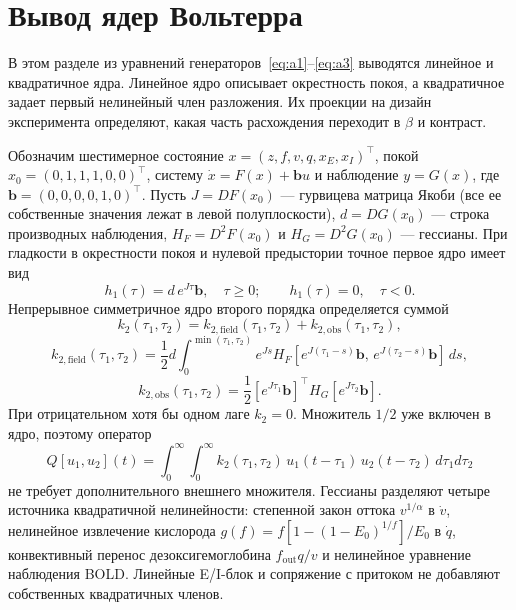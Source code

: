 
\section{Вывод ядер Вольтерра}
\label{sec:mathspec}

В этом разделе из уравнений генераторов~\eqref{eq:a1}--\eqref{eq:a3} выводятся линейное и квадратичное ядра. Линейное ядро описывает окрестность покоя, а квадратичное задает первый нелинейный член разложения. Их проекции на дизайн эксперимента определяют, какая часть расхождения переходит в $\beta$ и контраст.

Обозначим шестимерное состояние $x=(z,f,v,q,x_E,x_I)^\top$, покой $x_0=(0,1,1,1,0,0)^\top$, систему $\dot x=F(x)+\mathbf b u$ и наблюдение $y=G(x)$, где $\mathbf b=(0,0,0,0,1,0)^\top$. Пусть $J=DF(x_0)$ --- гурвицева матрица Якоби (все ее собственные значения лежат в левой полуплоскости), $d=DG(x_0)$ --- строка производных наблюдения, $H_F=D^2F(x_0)$ и $H_G=D^2G(x_0)$ --- гессианы. При гладкости в окрестности покоя и нулевой предыстории точное первое ядро имеет вид
\begin{equation}\label{eq:h1}
h_1(\tau)=d\,e^{J\tau}\mathbf b,\quad \tau\ge0;\qquad h_1(\tau)=0,\quad\tau<0.
\end{equation}
Непрерывное симметричное ядро второго порядка определяется суммой
\begin{equation}\label{eq:k2}
k_2(\tau_1,\tau_2)=k_{2,\mathrm{field}}(\tau_1,\tau_2)+k_{2,\mathrm{obs}}(\tau_1,\tau_2),
\end{equation}
\begin{equation}\label{eq:k2field}
k_{2,\mathrm{field}}(\tau_1,\tau_2)=\frac12 d\int_0^{\min(\tau_1,\tau_2)}e^{Js}H_F[e^{J(\tau_1-s)}\mathbf b,\,e^{J(\tau_2-s)}\mathbf b]\,ds,
\end{equation}
\begin{equation}\label{eq:k2obs}
k_{2,\mathrm{obs}}(\tau_1,\tau_2)=\frac12[e^{J\tau_1}\mathbf b]^\top H_G[e^{J\tau_2}\mathbf b].
\end{equation}
При отрицательном хотя бы одном лаге $k_2=0$. Множитель $1/2$ уже включен в ядро, поэтому оператор
\begin{equation}\label{eq:Q}
Q[u_1,u_2](t)=\int_0^\infty\int_0^\infty k_2(\tau_1,\tau_2)\,u_1(t-\tau_1)\,u_2(t-\tau_2)\,d\tau_1d\tau_2
\end{equation}
не требует дополнительного внешнего множителя. Гессианы разделяют четыре источника квадратичной нелинейности: степенной закон оттока $v^{1/\alpha}$ в $\dot v$, нелинейное извлечение кислорода $g(f)=f[1-(1-E_0)^{1/f}]/E_0$ в $\dot q$, конвективный перенос дезоксигемоглобина $f_{\mathrm{out}}q/v$ и нелинейное уравнение наблюдения BOLD. Линейные E/I-блок и сопряжение с притоком не добавляют собственных квадратичных членов.

